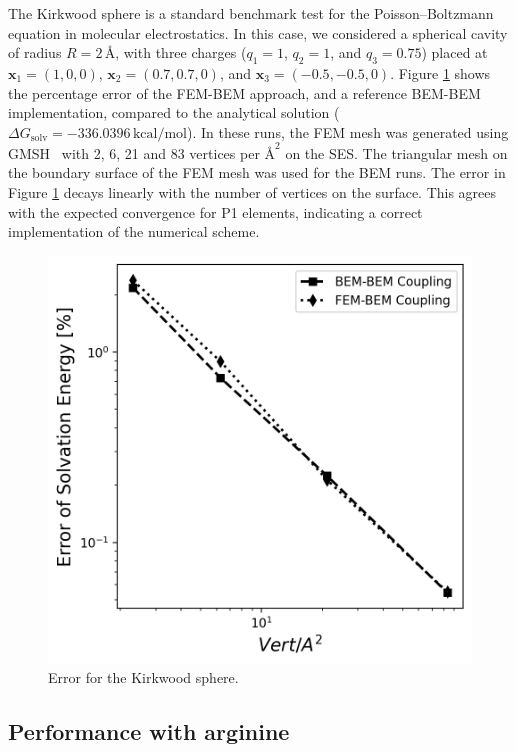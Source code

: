 The Kirkwood sphere \cite{Kirkwood1934} is a standard benchmark test for the Poisson--Boltzmann equation in molecular electrostatics. 
In this case, we considered a spherical cavity of radius $R=2\,\text{\AA}$, with three charges ($q_1=1$, $q_2=1$, and $q_3=0.75$) placed at $\mathbf{x}_1=(1,0,0)$, $\mathbf{x}_2=(0.7,0.7,0)$, and $\mathbf{x}_3=(-0.5,-0.5,0)$.
Figure \ref{fig:error_sphere} shows the percentage error of the FEM-BEM approach, and a reference BEM-BEM implementation, compared to the analytical solution ($\Delta G_{\text{solv}}= -336.0396\,\text{kcal/mol}$).
In these runs, the FEM mesh was generated using GMSH~\cite{geuzaine2009gmsh} 
with %
2, 6, 21 and 83 vertices per $\text{\AA}^2$ on the SES. The triangular mesh on the boundary surface of the FEM mesh was used for the BEM runs. 
The error in Figure \ref{fig:error_sphere} decays linearly with the number of vertices on the surface. This agrees with the expected convergence for P1 elements, indicating a correct implementation of the numerical scheme. 

\begin{figure}
  \centering
  \includegraphics[width=0.45\linewidth]{DolfinX_Sphere_const_coeff_error.png}
  \caption{Error for the Kirkwood sphere.  }
  \label{fig:error_sphere}
\end{figure}

\subsection*{\sffamily \large Performance with arginine}

